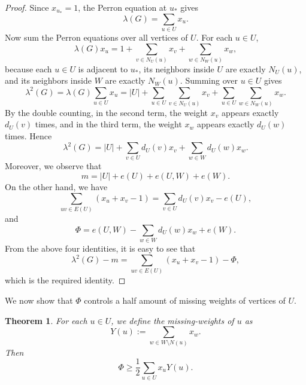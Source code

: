 \documentclass[10pt,a4paper]{amsart}
\newtheorem{theorem}{Theorem}[section]
\renewcommand{\ge}{\geqslant}
\begin{document}
\begin{proof}
Since $x_{u_*}=1$, the Perron equation at $u_*$ gives
\[
\lambda(G)=\sum_{u\in U}x_u.
\]
Now sum the Perron equations over all vertices of $U$. For each $u\in U$,
\[
\lambda(G)x_u=1+\sum_{v\in N_U(u)}x_v+\sum_{w\in N_W(u)}x_w,
\]
because each $u\in U$ is adjacent to $u_*$, its neighbors inside $U$ are exactly $N_U(u)$, and its neighbors inside $W$ are exactly $N_W(u)$.
Summing over $u\in U$ gives
\[ \lambda^2 (G) = 
\lambda(G)\sum_{u\in U}x_u
=
|U|+\sum_{u\in U}\sum_{v\in N_U(u)}x_v+\sum_{u\in U}\sum_{w\in N_W(u)}x_w.
\]
By the double counting, in the second term, the weight $x_v$ appears exactly $d_U(v)$ times, and in the third term, the weight $x_w$ appears exactly $d_U(w)$ times. 
Hence
\[
\lambda^2 (G)=|U|+\sum_{v\in U}d_U(v)x_v+\sum_{w\in W}d_U(w)x_w.
\] 
Moreover, we observe that 
\[
m=|U|+e(U)+e(U,W)+e(W).
\] 
On the other hand, we have
\[
\sum_{uv\in E(U)}(x_u+x_v-1)=\sum_{v\in U}d_U(v) x_v -e(U),
\]
and 
\[ \Phi =e(U,W) - \sum_{w\in W} d_U(w)x_w + e(W). \]
From the above four identities, it is easy to see that 
\[
\lambda^2(G)-m=\sum_{uv\in E(U)}(x_u+x_v-1)- \Phi,
\]
which is the required identity.
\end{proof}

We now show that $\Phi$ controls a half amount of missing weights of vertices of $U$.


\begin{theorem} \label{thm:halfmissing}
For each $u\in U$, we define the missing-weights of $u$ as  
$$ Y(u):=\sum_{w\in W\setminus N(u)}x_w. $$
Then  
\[
\Phi\ge \frac12\sum_{u\in U}x_uY(u).
\]
\end{theorem}
\end{document}
